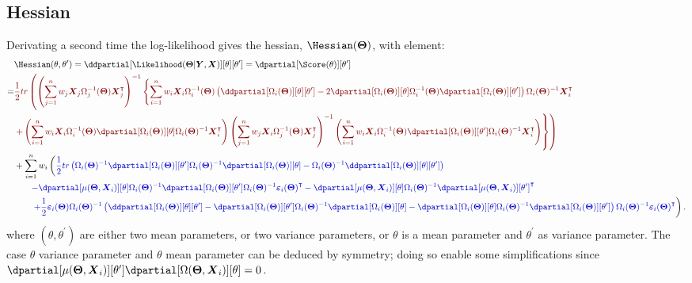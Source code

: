 \documentclass[12pt]{article}
\newcommand{\darkblue}{blue!80!black}
\newcommand{\darkred}{red!50!black}
\newcommand\trans[1]{{#1}^\intercal}%
\newcommand{\param}{\Theta}
\newcommand{\Vparam}{\boldsymbol{\param}}
\newcommand{\VX}{\boldsymbol{X}}
\newcommand{\VY}{\boldsymbol{Y}}
\newcommand{\Vvarepsilon}{\boldsymbol{\varepsilon}}
\begin{document}
\subsection{Hessian}
\label{SM:likelihood:hessian}
Derivating a second time the log-likelihood gives the hessian,
\(\Hessian(\Vparam)\), with element:
\begin{align*}
& \Hessian(\theta,\theta^{\prime}) = \ddpartial[\Likelihood(\Vparam|\VY,\VX)][\theta][\theta^{\prime}] = \dpartial[\Score(\theta)][\theta^{\prime}] \\
=& \textcolor{\darkred}{\frac{1}{2} tr \left( \left(\sum_{j=1}^n w_j \VX_j \Omega_j^{-1}(\Vparam) \trans{\VX}_j\right)^{-1} \left\{ \sum_{i=1}^n w_i \VX_i \Omega_i^{-1}(\Vparam) \left(\ddpartial[\Omega_i(\Vparam)][\theta][\theta^{\prime}] - 2 \dpartial[\Omega_i(\Vparam)][\theta] \Omega_i^{-1}(\Vparam) \dpartial[\Omega_i(\Vparam)][\theta^{\prime}]\right)\Omega_i(\Vparam)^{-1} \trans{\VX}_i \right.  \right.}  \\
& \textcolor{\darkred}{ \left. \left. + \left(\sum_{i=1}^n w_i \VX_i \Omega_i^{-1}(\Vparam) \dpartial[\Omega_i(\Vparam)][\theta] \Omega_i(\Vparam)^{-1} \trans{\VX}_i\right) \left(\sum_{j=1}^n w_j \VX_i\Omega_j^{-1}(\Vparam) \trans{\VX}_j \right)^{-1} \left(\sum_{i=1}^n w_i \VX_i \Omega_i^{-1}(\Vparam) \dpartial[\Omega_i(\Vparam)][\theta^{\prime}] \Omega_i(\Vparam)^{-1} \trans{\VX}_i\right) \right\} \right) } \\
& +\sum_{i=1}^n w_i \left( \textcolor{\darkblue}{ \frac{1}{2} tr\left(\Omega_i(\Vparam)^{-1} \dpartial[\Omega_i(\Vparam)][\theta^{\prime}] \Omega_i(\Vparam)^{-1} \dpartial[\Omega_i(\Vparam)][\theta] - \Omega_i(\Vparam)^{-1} \ddpartial[\Omega_i(\Vparam)][\theta][\theta^{\prime}] \right) } \right.\\
& \qquad \textcolor{\darkblue}{ -  \dpartial[\mu(\Vparam,\VX_i)][\theta] \Omega_i(\Vparam)^{-1} \dpartial[\Omega_i(\Vparam)][\theta^{\prime}] \Omega_i(\Vparam)^{-1} \trans{\Vvarepsilon_i(\Vparam)} - \dpartial[\mu(\Vparam,\VX_i)][\theta] \Omega_i(\Vparam)^{-1} \trans{\dpartial[\mu(\Vparam,\VX_i)][\theta^{\prime}]} } \\
& \qquad \left. \textcolor{\darkblue}{ + \frac{1}{2} \Vvarepsilon_i(\Vparam) \Omega_i(\Vparam)^{-1} \left(\ddpartial[\Omega_i(\Vparam)][\theta][\theta^{\prime}] - \dpartial[\Omega_i(\Vparam)][\theta^{\prime}] \Omega_i(\Vparam)^{-1} \dpartial[\Omega_i(\Vparam)][\theta] - \dpartial[\Omega_i(\Vparam)][\theta] \Omega_i(\Vparam)^{-1} \dpartial[\Omega_i(\Vparam)][\theta^{\prime}] \right) \Omega_i(\Vparam)^{-1} \trans{\Vvarepsilon_i(\Vparam)} } \right).
\end{align*}
where \((\theta,\theta^{\prime})\) are either two mean parameters, or
 two variance parameters, or \(\theta\) is a mean parameter and
 \(\theta^{\prime}\) as variance parameter. The case \(\theta\)
 variance parameter and \(\theta\) mean parameter can be deduced by
 symmetry; doing so enable some simplifications since
 \(\dpartial[\mu(\Vparam,\VX_i)][\theta^{\prime}]\dpartial[\Omega(\Vparam,\VX_i)][\theta]=0\).
\end{document}
